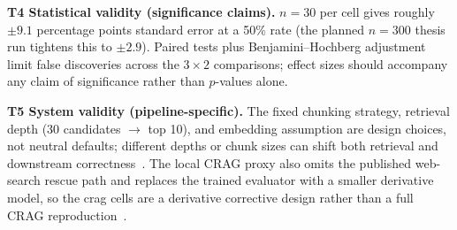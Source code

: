 \textbf{T4 Statistical validity (significance claims).}
$n=30$ per cell gives roughly $\pm 9.1$ percentage points standard error
at a 50\% rate (the planned $n=300$ thesis run tightens this to $\pm 2.9$). Paired tests plus Benjamini--Hochberg adjustment
limit false discoveries across the $3 \times 2$ comparisons; effect sizes
should accompany any claim of significance rather than $p$-values alone.

\textbf{T5 System validity (pipeline-specific).}
The fixed chunking strategy, retrieval depth (30 candidates $\rightarrow$
top 10), and embedding assumption are design choices, not neutral
defaults; different depths or chunk sizes can shift both retrieval and
downstream correctness~\cite{elkiran2026empirical}. The local CRAG
proxy also omits the published web-search rescue path and replaces the
trained evaluator with a smaller derivative model, so the crag cells are
a derivative corrective design rather than a full CRAG
reproduction~\cite{yan2024crag}.
